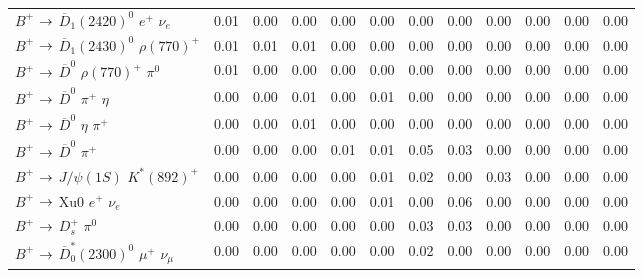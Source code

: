 {\begin{tabular}{lrrrrrrrrrrr}
$B^{+}$ $\rightarrow$ $\overline{D}_{1}(2420)^{0}$ $e^{+}$ $\nu_{e}$         &         0.01 &         0.00 &         0.00 &         0.00 &         0.00 &         0.00 &         0.00 &         0.00 &         0.00 &         0.00 &         0.00 \\
$B^{+}$ $\rightarrow$ $\overline{D}_{1}(2430)^{0}$ $\rho(770)^{+}$           &         0.01 &         0.01 &         0.01 &         0.00 &         0.00 &         0.00 &         0.00 &         0.00 &         0.00 &         0.00 &         0.00 \\
$B^{+}$ $\rightarrow$ $\overline{D}^{0}$ $\rho(770)^{+}$ $\pi^{0}$           &         0.01 &         0.00 &         0.00 &         0.00 &         0.00 &         0.00 &         0.00 &         0.00 &         0.00 &         0.00 &         0.00 \\
$B^{+}$ $\rightarrow$ $\overline{D}^{0}$ $\pi^{+}$ $\eta$                    &         0.00 &         0.00 &         0.01 &         0.00 &         0.01 &         0.00 &         0.00 &         0.00 &         0.00 &         0.00 &         0.00 \\
$B^{+}$ $\rightarrow$ $\overline{D}^{0}$ $\eta$ $\pi^{+}$                    &         0.00 &         0.00 &         0.01 &         0.00 &         0.00 &         0.00 &         0.00 &         0.00 &         0.00 &         0.00 &         0.00 \\
$B^{+}$ $\rightarrow$ $\overline{D}^{0}$ $\pi^{+}$                           &         0.00 &         0.00 &         0.00 &         0.01 &         0.01 &         0.05 &         0.03 &         0.00 &         0.00 &         0.00 &         0.00 \\
$B^{+}$ $\rightarrow$ $J/\psi(1S)$ $K^{*}(892)^{+}$                          &         0.00 &         0.00 &         0.00 &         0.00 &         0.01 &         0.02 &         0.00 &         0.03 &         0.00 &         0.00 &         0.00 \\
$B^{+}$ $\rightarrow$ Xu0 $e^{+}$ $\nu_{e}$                                  &         0.00 &         0.00 &         0.00 &         0.00 &         0.01 &         0.00 &         0.06 &         0.00 &         0.00 &         0.00 &         0.00 \\
$B^{+}$ $\rightarrow$ $D_{s}^{+}$ $\pi^{0}$                                  &         0.00 &         0.00 &         0.00 &         0.00 &         0.00 &         0.03 &         0.03 &         0.00 &         0.00 &         0.00 &         0.00 \\
$B^{+}$ $\rightarrow$ $\overline{D}_{0}^{*}(2300)^{0}$ $\mu^{+}$ $\nu_{\mu}$ &         0.00 &         0.00 &         0.00 &         0.00 &         0.00 &         0.02 &         0.00 &         0.00 &         0.00 &         0.00 &         0.00 \\

\end{tabular}}
